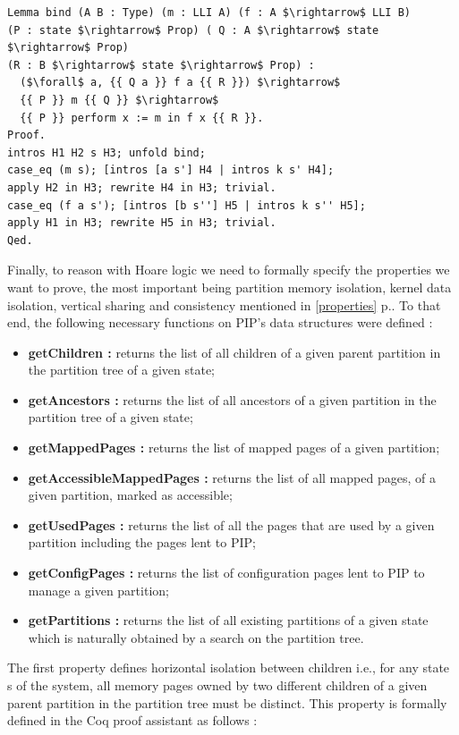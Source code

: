 \begin{lstlisting}[caption = {Hoare triples assignment rule in the shallow embedding},label = {shallow_assign},mathescape=true]
Lemma bind (A B : Type) (m : LLI A) (f : A $\rightarrow$ LLI B) 
(P : state $\rightarrow$ Prop) ( Q : A $\rightarrow$ state $\rightarrow$ Prop) 
(R : B $\rightarrow$ state $\rightarrow$ Prop) :
  ($\forall$ a, {{ Q a }} f a {{ R }}) $\rightarrow$ 
  {{ P }} m {{ Q }} $\rightarrow$ 
  {{ P }} perform x := m in f x {{ R }}.
Proof. 
intros H1 H2 s H3; unfold bind;
case_eq (m s); [intros [a s'] H4 | intros k s' H4];
apply H2 in H3; rewrite H4 in H3; trivial.
case_eq (f a s'); [intros [b s''] H5 | intros k s'' H5];
apply H1 in H3; rewrite H5 in H3; trivial.
Qed. 
\end{lstlisting}

Finally, to reason with Hoare logic we need to formally  specify the properties we want to prove, the most important being partition memory isolation,
kernel data isolation, vertical sharing and consistency mentioned in \ref{properties} p.\pageref{properties}. To that end, the following necessary functions on PIP's data structures were defined : 
\begin{itemize}
	\item \textbf{getChildren :} returns the list of all children of a given parent partition in the partition tree of a given state;
	\item \textbf{getAncestors :} returns the list of all ancestors of a given partition in the partition tree of a given state;
	\item \textbf{getMappedPages :} returns the list of mapped pages of a given partition;
	\item \textbf{getAccessibleMappedPages :} returns the list of all mapped pages, of a given partition, marked as accessible;
	\item \textbf{getUsedPages :} returns the list of all the pages that are used by a given partition including the pages lent to PIP;
		\item \textbf{getConfigPages :} returns the list of configuration pages lent to PIP to manage a given partition;
	\item \textbf{getPartitions :} returns the list of all existing partitions of a given state which is naturally obtained by a search on the partition tree.
\end{itemize} 
The first property defines horizontal isolation between children i.e., for any state s of the system, all memory pages owned by two different children of a given parent partition in the partition tree must be distinct. This property is formally defined in the Coq proof assistant as follows :
